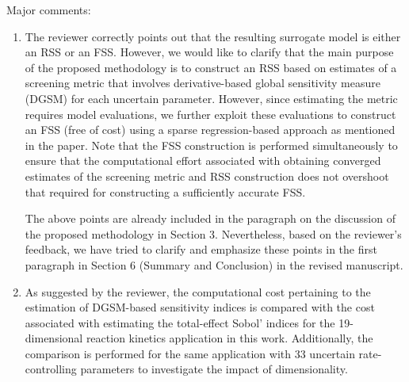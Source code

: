 \documentclass[11pt,final]{article}
\newcommand{\referee}[1]{\vspace{.1ex}\noindent{\textcolor{blue}{#1}}}
\begin{document}
Major comments:
\begin{enumerate}

\item
\referee{
In this paper, the constructed surrogate model is either a RSS or a FSS. Based
on the diagram on page 12, the resulting RSS is built upon the not sufficiently
accurate FSS model (which could lead the accuracy to decrease further), or
is the RSS constructed directly from the original model with reduced input
parameters? The diagram is ambigous on this issue.}

The reviewer correctly points out that the resulting surrogate model is either an RSS or
an FSS. However, we would like to clarify that the main purpose of the proposed
methodology is to construct an RSS based on estimates of a screening metric that
involves derivative-based global sensitivity measure (DGSM) for each uncertain parameter.
However, since estimating the metric requires model evaluations, we further exploit these
evaluations to construct an FSS (free of cost) using a sparse regression-based approach
as mentioned in the paper. Note that the FSS construction is performed simultaneously to 
ensure that the computational effort associated with obtaining converged estimates of
the screening metric and RSS construction does not overshoot that required for
constructing a sufficiently accurate FSS. 

The above points are already included in the paragraph on the discussion of the proposed
methodology in Section 3. Nevertheless, based on the reviewer's feedback, we have tried to
clarify and emphasize these points in the first paragraph in Section 6 (Summary and Conclusion)
in the revised manuscript. 

\item
\referee{The reviewer would also like to see the comparison of the computational cost
(not just the numerical results) of DGSMs to variance based sensitivity indices
with increasing parameter dimension, e.g. Sobol’ indices incorporated with
sparse grid, since the difference decreases with increasing number of parameters.}

As suggested by the reviewer, the computational cost pertaining to the estimation of DGSM-based
sensitivity indices is compared with the cost associated with estimating the total-effect Sobol' indices
for the 19-dimensional reaction kinetics application in this work. Additionally, the comparison is 
performed for the same application with 33 uncertain rate-controlling parameters to investigate
the impact of dimensionality. 


\end{enumerate}
\end{document}
